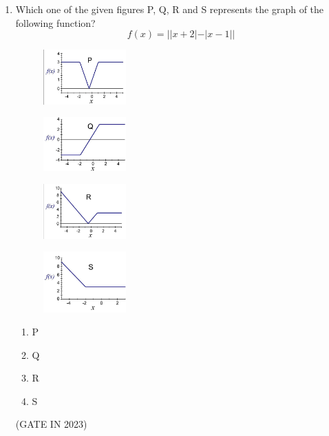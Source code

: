 \documentclass[journal]{IEEEtran}
\begin{document}
\begin{enumerate}
    \item Which one of the given figures P, Q, R and S represents the graph of the following function?
    $$f(x) = ||x+2| - |x-1||$$
        \begin{multicols}{2}
    \begin{figure}[H]
      \includegraphics[width=0.3\textwidth]{6.png} 
      \caption{}
    \label{fig:fig6} 
\end{figure}
\begin{figure}[H]
      \includegraphics[width=0.3\textwidth]{7.png} 
      \caption{}
    \label{fig:fig7} 
\end{figure}
\begin{figure}[H]
      \includegraphics[width=0.3\textwidth]{8.png} 
      \caption{}
    \label{fig:fig8} 
\end{figure}
\begin{figure}[H]
      \includegraphics[width=0.3\textwidth]{9.png} 
      \caption{}
    \label{fig:fig9} 
\end{figure}
\end{multicols}
    
    \begin{enumerate}
        \item P
        \item Q
        \item R
        \item S
    \end{enumerate}
    \hfill(GATE IN 2023)


\end{enumerate}
\end{document}

